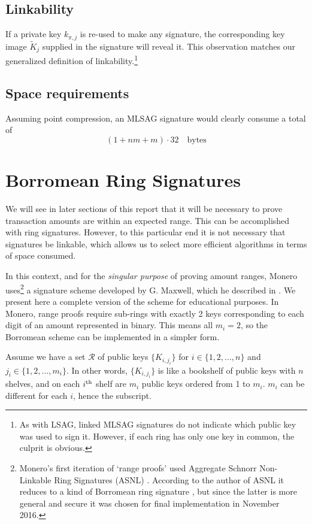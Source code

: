\subsection*{Linkability}

If a private key \(k_{\pi, j}\) is re-used to make any signature, the corresponding key image \(\tilde{K}_j\) supplied in the signature will reveal it. This observation matches our generalized definition of linkability.\footnote{As with LSAG, linked MLSAG signatures do not indicate which public key was used to sign it. However, if each ring has only one key in common, the culprit is obvious.}


\subsection*{Space requirements}

Assuming point compression, an MLSAG signature would clearly consume a total of 
    \[(1 + n m + m) \cdot 32 \quad \textrm{bytes}\]


\section{Borromean Ring Signatures}
\label{sec:borromean}

We will see in later sections of this report that it will be necessary to prove transaction amounts are within an expected range. This can be accomplished with ring signatures. However, to this particular end it is not necessary that signatures be linkable, which allows us to select more efficient algorithms in terms of space consumed.

In this context, and for the {\em singular purpose} of proving amount ranges, Monero uses\footnote{\label{asnl_note}Monero’s first iteration of `range proofs’ used Aggregate Schnorr Non-Linkable Ring Signatures (ASNL) \cite{ledger34}. According to the author of ASNL it reduces to a kind of Borromean ring signature \cite{ASNL-issue}, but since the latter is more general and secure it was chosen for final implementation in November 2016.} a signature scheme developed by G. Maxwell, which he described in \cite{Signatures2015BorromeanRS}. We present here a complete version of the scheme for educational purposes. In Monero, range proofs require sub-rings with exactly 2 keys corresponding to each digit of an amount represented in binary. This means all $m_i = 2$, so the Borromean scheme can be implemented in a simpler form.

Assume we have a set $\mathcal{R}$ of public keys $\{K_{i,j_i}\}$ for $i \in \{1,2,...,n\}$ and $j_i \in \{1, 2, ..., m_i\}$. In other words, $\{K_{i,j_i}\}$ is like a bookshelf of public keys with $n$ shelves, and on each $i\textsuperscript{th}$ shelf are $m_i$ public keys ordered from 1 to $m_i$. $m_i$ can be different for each $i$, hence the subscript.

